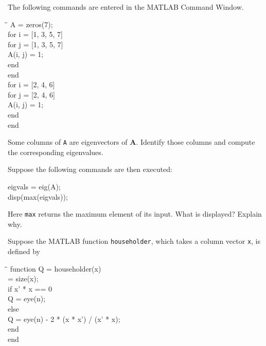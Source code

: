 \begin{problem}
The following commands are entered in the MATLAB Command Window.

{\small\ttfamily
\begin{tabbing}
\hspace{2em}\=\hspace{2em}\=\kill
A = zeros(7);\\
for i = [1, 3, 5, 7]\\
\>for j = [1, 3, 5, 7]\\
\>\>A(i, j) = 1;\\
\>end\\
end\\
for i = [2, 4, 6]\\
\>for j = [2, 4, 6]\\
\>\>A(i, j) = 1;\\
\>end\\
end
\end{tabbing}
}

\begin{problemsubparts}
\item Some columns of \texttt{A} are eigenvectors of $\mathbf A$. Identify those columns and compute the corresponding eigenvalues.
\item Suppose the following commands are then executed:

{\small\ttfamily
\begin{tabbing}
eigvals = eig(A);\\
disp(max(eigvals));
\end{tabbing}
}

Here \texttt{max} returns the maximum element of its input. What is displayed? Explain why.
\end{problemsubparts}

Suppose the MATLAB function \texttt{householder}, which takes a column vector \texttt{x}, is defined by

{\small\ttfamily
\begin{tabbing}
\hspace{2em}\=\hspace{2em}\=\kill
function Q = householder(x)\\
\>[n, m] = size(x);\\
\>if x' * x == 0\\
\>\>Q = eye(n);\\
\>else\\
\>\>Q = eye(n) - 2 * (x * x') / (x' * x);\\
\>end\\
end
\end{tabbing}
}


\end{problem}
